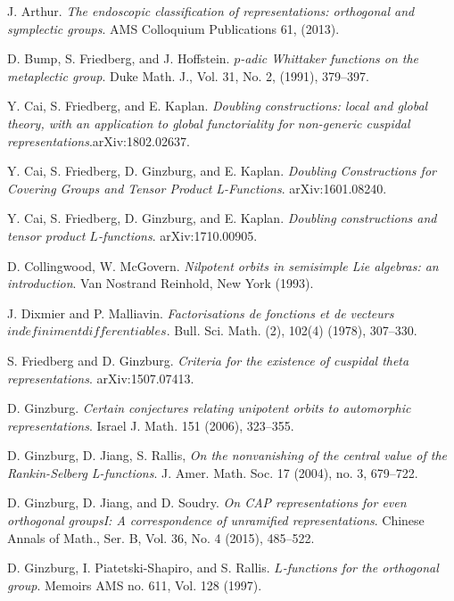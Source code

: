 \documentclass[12pts]{amsart}
\begin{document}
\begin{thebibliography}{}
	
	J. Arthur. \textit{ The endoscopic classification of representations: orthogonal and symplectic groups}. AMS Colloquium Publications 61, (2013).	
		
	D. Bump, S. Friedberg, and J. Hoffstein. \textit{$p$-adic Whittaker functions on the metaplectic group}. Duke Math. J., Vol. 31, No. 2, (1991), 379--397.
	
	 Y. Cai, S. Friedberg, and E. Kaplan. \textit{Doubling constructions: local and global theory, with an application to global functoriality
	for non-generic cuspidal representations}.arXiv:1802.02637.
	
	 Y. Cai, S. Friedberg, D. Ginzburg, and E. Kaplan. \textit{Doubling Constructions for Covering Groups and Tensor Product L-Functions}. arXiv:1601.08240.	
	
	Y. Cai, S. Friedberg, D. Ginzburg, and E. Kaplan. \textit{Doubling
		constructions and tensor product $L$-functions}. arXiv:1710.00905.
	
	D. Collingwood, W. McGovern. \textit{Nilpotent orbits in semisimple Lie algebras: an introduction}. Van Nostrand Reinhold, New York (1993).
	
	
	J. Dixmier and P. Malliavin. \textit{Factorisations de fonctions et
		de vecteurs $ind\acute{e}finiment diff\acute{e}rentiables$}. Bull.
	Sci. Math. (2), 102(4) (1978), 307--330.
	
	S. Friedberg and D. Ginzburg. \textit{Criteria for the existence of
		cuspidal theta representations}. arXiv:1507.07413.
	
	D. Ginzburg. \textit{Certain conjectures relating unipotent orbits
		to automorphic representations}. Israel J. Math. 151 (2006),
	323--355.
	
	 D. Ginzburg, D. Jiang, S. Rallis,  \textit{On the nonvanishing of the central value of the Rankin-Selberg L-functions}. J. Amer. Math. Soc. 17 (2004), no. 3, 679--722.
	
	
	D. Ginzburg, D. Jiang, and D. Soudry. \textit{On CAP representations
		for even orthogonal groupsI: A correspondence of unramified
		representations}. Chinese Annals of Math., Ser. B, Vol. 36, No. 4
	(2015), 485--522.
	
	D. Ginzburg, I. Piatetski-Shapiro, and S. Rallis.
	\textit{$L$-functions for the orthogonal group}. Memoirs AMS no.
	611, Vol. 128 (1997).
	

\end{thebibliography}
\end{document}
